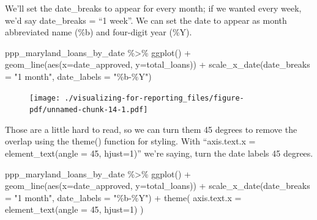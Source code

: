 \documentclass[
  letterpaper,
  DIV=11,
  numbers=noendperiod]{scrreprt}
\newenvironment{Shaded}{\begin{snugshade}}{\end{snugshade}}
\newcommand{\AttributeTok}[1]{\textcolor[rgb]{0.40,0.45,0.13}{#1}}
\newcommand{\DecValTok}[1]{\textcolor[rgb]{0.68,0.00,0.00}{#1}}
\newcommand{\FunctionTok}[1]{\textcolor[rgb]{0.28,0.35,0.67}{#1}}
\newcommand{\NormalTok}[1]{\textcolor[rgb]{0.00,0.23,0.31}{#1}}
\newcommand{\SpecialCharTok}[1]{\textcolor[rgb]{0.37,0.37,0.37}{#1}}
\newcommand{\StringTok}[1]{\textcolor[rgb]{0.13,0.47,0.30}{#1}}
\begin{document}
We'll set the date\_breaks to appear for every month; if we wanted every
week, we'd say date\_breaks = ``1 week''. We can set the date to appear
as month abbreviated name (\%b) and four-digit year (\%Y).

\begin{Shaded}
\begin{Highlighting}[]
\NormalTok{ppp\_maryland\_loans\_by\_date }\SpecialCharTok{\%\textgreater{}\%}
  \FunctionTok{ggplot}\NormalTok{() }\SpecialCharTok{+} 
  \FunctionTok{geom\_line}\NormalTok{(}\FunctionTok{aes}\NormalTok{(}\AttributeTok{x=}\NormalTok{date\_approved, }\AttributeTok{y=}\NormalTok{total\_loans)) }\SpecialCharTok{+} 
  \FunctionTok{scale\_x\_date}\NormalTok{(}\AttributeTok{date\_breaks =} \StringTok{"1 month"}\NormalTok{, }\AttributeTok{date\_labels =} \StringTok{"\%b{-}\%Y"}\NormalTok{)}
\end{Highlighting}
\end{Shaded}

\begin{figure}[H]

{\centering \texttt{[image: ./visualizing-for-reporting\_files/figure-pdf/unnamed-chunk-14-1.pdf]}

}

\end{figure}

Those are a little hard to read, so we can turn them 45 degrees to
remove the overlap using the theme() function for styling. With
``axis.text.x = element\_text(angle = 45, hjust=1)'' we're saying, turn
the date labels 45 degrees.

\begin{Shaded}
\begin{Highlighting}[]
\NormalTok{ppp\_maryland\_loans\_by\_date }\SpecialCharTok{\%\textgreater{}\%}
  \FunctionTok{ggplot}\NormalTok{() }\SpecialCharTok{+} 
  \FunctionTok{geom\_line}\NormalTok{(}\FunctionTok{aes}\NormalTok{(}\AttributeTok{x=}\NormalTok{date\_approved, }\AttributeTok{y=}\NormalTok{total\_loans)) }\SpecialCharTok{+} 
  \FunctionTok{scale\_x\_date}\NormalTok{(}\AttributeTok{date\_breaks =} \StringTok{"1 month"}\NormalTok{, }\AttributeTok{date\_labels =} \StringTok{"\%b{-}\%Y"}\NormalTok{) }\SpecialCharTok{+}
  \FunctionTok{theme}\NormalTok{(}
    \AttributeTok{axis.text.x =} \FunctionTok{element\_text}\NormalTok{(}\AttributeTok{angle =} \DecValTok{45}\NormalTok{,  }\AttributeTok{hjust=}\DecValTok{1}\NormalTok{)}
\NormalTok{  )}
\end{Highlighting}
\end{Shaded}
\end{document}

